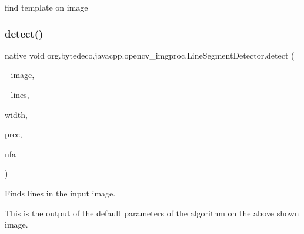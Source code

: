 find template on image \mbox{\label{group__imgproc_gae1e811b637738b2c10d97ca72abcf5d0}} 
\subsubsection{\texorpdfstring{detect()}{detect()}\hspace{0.1cm}{\footnotesize\ttfamily [2/2]}}
{\footnotesize\ttfamily native void org.\+bytedeco.\+javacpp.\+opencv\+\_\+imgproc.\+Line\+Segment\+Detector.\+detect (\begin{DoxyParamCaption}\item[{@By\+Val Mat}]{\+\_\+image,  }\item[{@By\+Val Mat}]{\+\_\+lines,  }\item[{@By\+Val(null\+Value=\char`\"{}cv\+::\+Output\+Array(cv\+::no\+Array())\char`\"{}) Mat}]{width,  }\item[{@By\+Val(null\+Value=\char`\"{}cv\+::\+Output\+Array(cv\+::no\+Array())\char`\"{}) Mat}]{prec,  }\item[{@By\+Val(null\+Value=\char`\"{}cv\+::\+Output\+Array(cv\+::no\+Array())\char`\"{}) Mat}]{nfa }\end{DoxyParamCaption})}



Finds lines in the input image. 

This is the output of the default parameters of the algorithm on the above shown image. 

 


